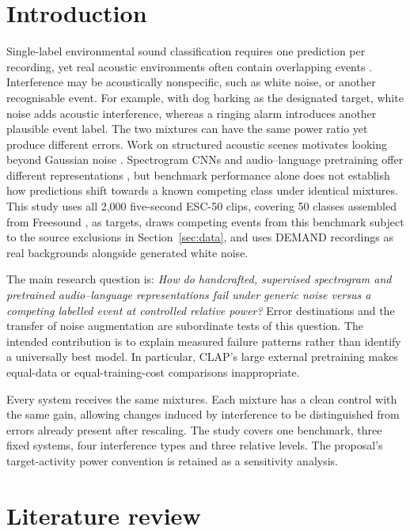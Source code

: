 \documentclass[a4paper,10pt]{article}
\begin{document}
\section{Introduction}

Single-label environmental sound classification requires one prediction per recording, yet real acoustic environments often contain overlapping events \cite{sed}. Interference may be acoustically nonspecific, such as white noise, or another recognisable event. For example, with dog barking as the designated target, white noise adds acoustic interference, whereas a ringing alarm introduces another plausible event label. The two mixtures can have the same power ratio yet produce different errors. Work on structured acoustic scenes motivates looking beyond Gaussian noise \cite{rsa}. Spectrogram CNNs and audio--language pretraining offer different representations \cite{piczak,clap}, but benchmark performance alone does not establish how predictions shift towards a known competing class under identical mixtures. This study uses all 2,000 five-second ESC-50 clips, covering 50 classes assembled from Freesound \cite{esc}, as targets, draws competing events from this benchmark subject to the source exclusions in Section~\ref{sec:data}, and uses DEMAND recordings \cite{demand} as real backgrounds alongside generated white noise.

The main research question is: \emph{How do handcrafted, supervised spectrogram and pretrained audio--language representations fail under generic noise versus a competing labelled event at controlled relative power?} Error destinations and the transfer of noise augmentation are subordinate tests of this question. The intended contribution is to explain measured failure patterns rather than identify a universally best model. In particular, CLAP's large external pretraining makes equal-data or equal-training-cost comparisons inappropriate.

Every system receives the same mixtures. Each mixture has a clean control with the same gain, allowing changes induced by interference to be distinguished from errors already present after rescaling. The study covers one benchmark, three fixed systems, four interference types and three relative levels. The proposal's target-activity power convention is retained as a sensitivity analysis.

\section{Literature review}
\end{document}
